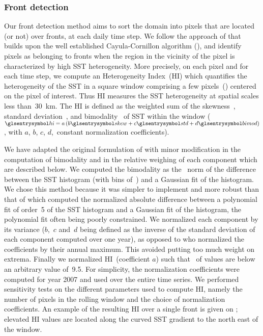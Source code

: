 \subsubsection{Front detection}

Our front detection method aims to sort the domain into pixels that are located (or not) over fronts, at each daily time step.
We follow the approach of \textcite{liu_2016} that builds upon the well established Cayula-Cornillon algorithm (\cite{cayula_1992, belkin_2009}), and identify pixels as belonging to fronts when the region in the vicinity of the pixel is characterized by high SST heterogeneity.
More precisely, on each pixel and for each time step, we compute an Heterogeneity Index~(HI) which quantifies the heterogeneity of the SST in a square window comprising a few pixels~() centered on the pixel of interest.
Thus HI measures the SST heterogeneity at spatial scales less than~\qty{30}{\km}.
The HI is defined as the weighted sum of the skewness~, standard deviation~, and bimodality~ of SST within the window (\(\am{hi} = a \left( b \am{skew} + c \am{std} + d \am{bimod} \right)\), with \(a\), \(b\), \(c\), \(d\),~constant normalization coefficients).

We have adapted the original formulation of \textcite{liu_2016} with minor modification in the computation of bimodality and in the relative weighing of each component which are described below.
We computed the bimodality as the ~norm of the difference between the SST histogram (with bins of~) and a Gaussian fit of the histogram.
We chose this method because it was simpler to implement and more robust than that of \textcite{liu_2016} which computed the normalized absolute difference between a polynomial fit of order~5 of the SST histogram and a Gaussian fit of the histogram, the polynomial fit often being poorly constrained.
We normalized each component by its variance (\(b\),~\(c\) and~\(d\) being defined as the inverse of the standard deviation of each component computed over one year), as opposed to \textcite{liu_2016} who normalized the coefficients by their annual maximum.
This avoided putting too much weight on extrema.
Finally we normalized HI~(coefficient \(a\)) such that~ of values are below an arbitrary value of~9.5.
For simplicity, the normalization coefficients were computed for year 2007 and used over the entire time series.
We performed sensitivity tests on the different parameters used to compute HI, namely the number of pixels in the rolling window and the choice of normalization coefficients.
An example of the resulting HI over a single front is given on  ; elevated HI values are located along the curved SST gradient to the north east of the window.

